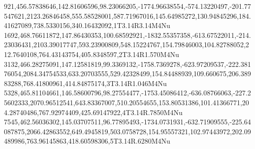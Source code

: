 921,456.57838646,142.81606596,98.23066205,-1774.96638554,-574.13220497,-201.77547621,2123.26846458,555.58528001,587.71967016,145.64985272,130.94845296,184.41627089,738.5330156,340.16432092,1T3.14R3.14M4Nu
1692,468.76611872,147.86430353,100.68592921,-1832.55357358,-613.67522011,-214.23036431,2103.39017747,593.23900809,548.15224767,154.79846003,104.82788052,212.7640108,764.43143754,405.8348597,2T3.14R1.570M4Nu
3132,466.28275091,147.12581819,99.3369132,-1758.7369278,-623.97209537,-222.38176054,2084.34754533,633.20703555,529.42328499,154.84488939,109.660675,206.38983288,768.41800961,414.84875174,3T3.14R1.046M4Nu
5328,465.81104661,146.58600796,98.27554477,-1753.45086412,-636.08766063,-227.25602333,2070.96512541,643.83367007,510.20554655,153.80531386,101.41366771,204.28740486,767.92974409,425.69147922,4T3.14R.7850M4Nu
7545,462.56036302,145.03707511,96.77895493,-1734.0731931,-632.71909555,-225.64087875,2066.42863552,649.4945819,503.0758728,154.95557321,102.97443972,202.09489986,763.96145863,418.60598306,5T3.14R.6280M4Nu
